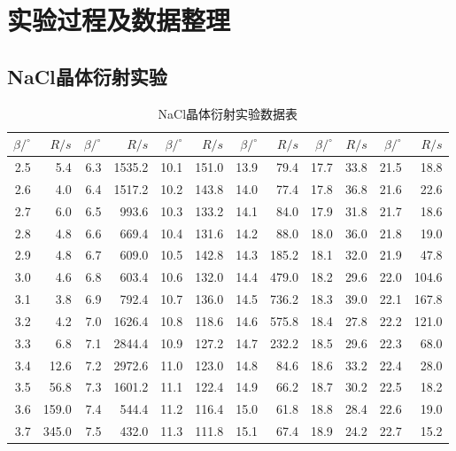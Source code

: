 \documentclass[UTF8]{ctexart}
\begin{document}
	\section{实验过程及数据整理}
	\subsection{NaCl晶体衍射实验}
{
		\centering
	\begin{longtable}{||r|r||r|r||r|r||r|r||r|r||r|r||}
		\caption{NaCl晶体衍射实验数据表}
	\\ \hline
	\hline
		$\beta/^{\circ}$     & $R/s$     & $\beta/^{\circ}$     & $R/s$     & $\beta/^{\circ}$     & $R/s$     & $\beta/^{\circ}$     & $R/s$ & $\beta/^{\circ}$     & $R/s$ & $\beta/^{\circ}$     & $R/s$\\
		\hline
		2.5   & 5.4   & 6.3   & 1535.2  & 10.1  & 151.0  & 13.9  & 79.4  & 17.7  & 33.8  & 21.5  & 18.8  \\
		2.6   & 4.0   & 6.4   & 1517.2  & 10.2  & 143.8  & 14.0  & 77.4  & 17.8  & 36.8  & 21.6  & 22.6  \\
		2.7   & 6.0   & 6.5   & 993.6  & 10.3  & 133.2  & 14.1  & 84.0  & 17.9  & 31.8  & 21.7  & 18.6  \\
		2.8   & 4.8   & 6.6   & 669.4  & 10.4  & 131.6  & 14.2  & 88.0  & 18.0  & 36.0  & 21.8  & 19.0  \\
		2.9   & 4.8   & 6.7   & 609.0  & 10.5  & 142.8  & 14.3  & 185.2  & 18.1  & 32.0  & 21.9  & 47.8  \\
		3.0   & 4.6   & 6.8   & 603.4  & 10.6  & 132.0  & 14.4  & 479.0  & 18.2  & 29.6  & 22.0  & 104.6  \\
		3.1   & 3.8   & 6.9   & 792.4  & 10.7  & 136.0  & 14.5  & 736.2  & 18.3  & 39.0  & 22.1  & 167.8  \\
		3.2   & 4.2   & 7.0   & 1626.4  & 10.8  & 118.6  & 14.6  & 575.8  & 18.4  & 27.8  & 22.2  & 121.0  \\
		3.3   & 6.8   & 7.1   & 2844.4  & 10.9  & 127.2  & 14.7  & 232.2  & 18.5  & 29.6  & 22.3  & 68.0  \\
		3.4   & 12.6  & 7.2   & 2972.6  & 11.0  & 123.0  & 14.8  & 84.6  & 18.6  & 33.2  & 22.4  & 28.0  \\
		\hline
		\hline
		3.5   & 56.8  & 7.3   & 1601.2  & 11.1  & 122.4  & 14.9  & 66.2  & 18.7  & 30.2  & 22.5  & 18.2  \\
		3.6   & 159.0  & 7.4   & 544.4  & 11.2  & 116.4  & 15.0  & 61.8  & 18.8  & 28.4  & 22.6  & 19.0  \\
		3.7   & 345.0  & 7.5   & 432.0  & 11.3  & 111.8  & 15.1  & 67.4  & 18.9  & 24.2  & 22.7  & 15.2  \\

\end{longtable}}
\end{document}

